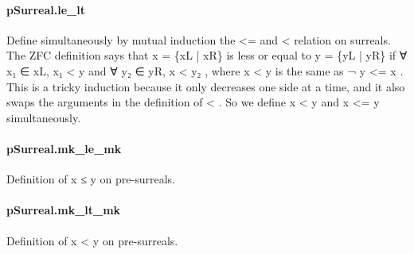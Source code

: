 \documentclass{article}
\begin{document}
\paragraph{pSurreal.le\_lt}
\par
Define simultaneously by mutual induction the 
\colorbox[RGB]{253,246,227}{{{{\color[RGB]{181, 137, 0} <= }}}} and 
\colorbox[RGB]{253,246,227}{{{{\color[RGB]{181, 137, 0} < }}}}relation on surreals. The ZFC definition says that 
\colorbox[RGB]{253,246,227}{{{{\color[RGB]{101, 123, 131} x  }}}{{{\color[RGB]{181, 137, 0} = }}}{{{\color[RGB]{101, 123, 131}  \{xL | xR\} }}}}is less or equal to 
\colorbox[RGB]{253,246,227}{{{{\color[RGB]{101, 123, 131} y  }}}{{{\color[RGB]{181, 137, 0} = }}}{{{\color[RGB]{101, 123, 131}  \{yL | yR\} }}}} if 
\colorbox[RGB]{253,246,227}{{{{\color[RGB]{101, 123, 131} ∀ x₁ ∈ xL, x₁  }}}{{{\color[RGB]{181, 137, 0} < }}}{{{\color[RGB]{101, 123, 131}  y }}}}and 
\colorbox[RGB]{253,246,227}{{{{\color[RGB]{101, 123, 131} ∀ y₂ ∈ yR, x  }}}{{{\color[RGB]{181, 137, 0} < }}}{{{\color[RGB]{101, 123, 131}  y₂ }}}}, where 
\colorbox[RGB]{253,246,227}{{{{\color[RGB]{101, 123, 131} x  }}}{{{\color[RGB]{181, 137, 0} < }}}{{{\color[RGB]{101, 123, 131}  y }}}} is the same as 
\colorbox[RGB]{253,246,227}{{{{\color[RGB]{181, 137, 0} ¬ }}}{{{\color[RGB]{101, 123, 131}  y  }}}{{{\color[RGB]{181, 137, 0} <= }}}{{{\color[RGB]{101, 123, 131}  x }}}}.
This is a tricky induction because it only decreases one side at
a time, and it also swaps the arguments in the definition of 
\colorbox[RGB]{253,246,227}{{{{\color[RGB]{181, 137, 0} < }}}}.
So we define 
\colorbox[RGB]{253,246,227}{{{{\color[RGB]{101, 123, 131} x  }}}{{{\color[RGB]{181, 137, 0} < }}}{{{\color[RGB]{101, 123, 131}  y }}}} and 
\colorbox[RGB]{253,246,227}{{{{\color[RGB]{101, 123, 131} x  }}}{{{\color[RGB]{181, 137, 0} <= }}}{{{\color[RGB]{101, 123, 131}  y }}}} simultaneously.
\paragraph{pSurreal.mk\_le\_mk}
\par
Definition of 
\colorbox[RGB]{253,246,227}{{{{\color[RGB]{101, 123, 131} x  }}}{{{\color[RGB]{181, 137, 0} ≤ }}}{{{\color[RGB]{101, 123, 131}  y }}}} on pre-surreals.
\paragraph{pSurreal.mk\_lt\_mk}
\par
Definition of 
\colorbox[RGB]{253,246,227}{{{{\color[RGB]{101, 123, 131} x  }}}{{{\color[RGB]{181, 137, 0} < }}}{{{\color[RGB]{101, 123, 131}  y }}}} on pre-surreals.
\end{document}

